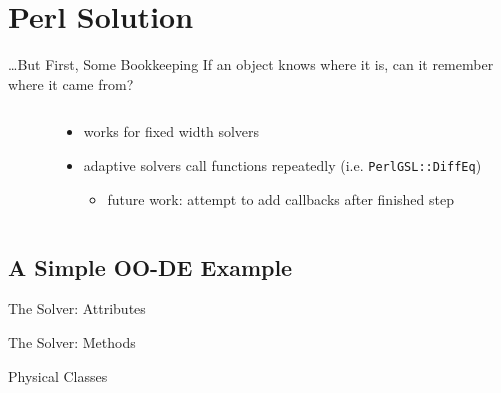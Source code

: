 \documentclass[mathserif]{beamer}
\providecommand{\code}[1]{{\texttt{\scriptsize{#1}}}}
\begin{document}
\section{Perl Solution}

\begin{frame}[fragile]{\ldots But First, Some Bookkeeping}
  If an object knows where it is, can it remember where it came from?
  \begin{columns}
    \begin{column}{0.49\linewidth}
      \begin{block}{}
        \scriptsize
        
      \end{block}
    \end{column}
    \begin{column}{0.49\linewidth}
      \begin{itemize}
        \item works for fixed width solvers
        \item adaptive solvers call functions repeatedly (i.e. \code{PerlGSL::DiffEq})
          \begin{itemize}
            \item future work: attempt to add callbacks after finished step
          \end{itemize}
      \end{itemize}
    \end{column}
  \end{columns}
\end{frame}

\subsection{A Simple OO-DE Example}

\begin{frame}{The Solver: Attributes}
  \begin{block}{}
    \scriptsize
    
  \end{block}
\end{frame}

\begin{frame}{The Solver: Methods}
  \begin{block}{}
    \scriptsize
    
  \end{block}
\end{frame}

\begin{frame}{Physical Classes}
  \begin{block}{}
    \scriptsize
    
  \end{block}
\end{frame}
\end{document}
